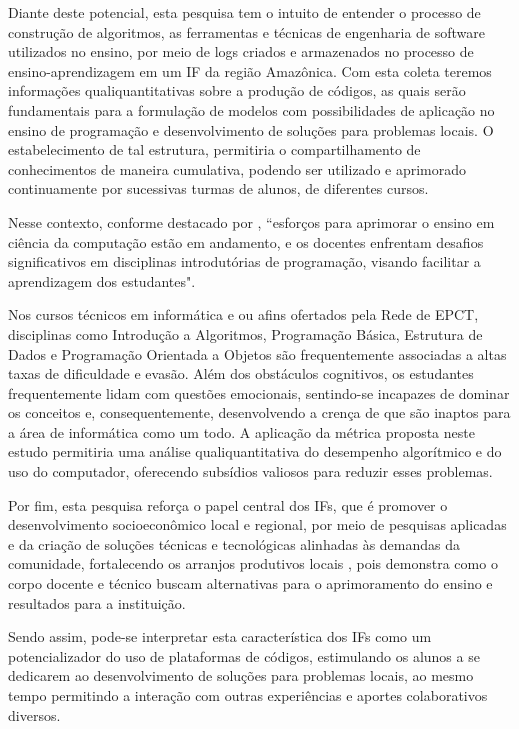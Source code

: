Diante deste potencial, esta pesquisa tem o intuito de entender o 
processo de construção de algoritmos, as ferramentas e técnicas de 
engenharia de software utilizados no ensino, por meio de logs criados e 
armazenados no processo de ensino-aprendizagem em um IF da região 
Amazônica. Com esta coleta  teremos informações qualiquantitativas 
sobre a produção de códigos, as quais serão fundamentais para a 
formulação de modelos com possibilidades de aplicação no ensino de 
programação e desenvolvimento de soluções para problemas locais. O 
estabelecimento de tal estrutura, permitiria o compartilhamento de 
conhecimentos de maneira cumulativa, podendo ser utilizado e aprimorado 
continuamente por  sucessivas turmas de alunos, de diferentes cursos.

Nesse contexto, conforme destacado por \cite{qian2017students}, 
``esforços para aprimorar o ensino em ciência da computação estão em 
andamento, e os docentes enfrentam desafios significativos em 
disciplinas introdutórias de programação, visando facilitar a 
aprendizagem dos estudantes". 

Nos cursos técnicos em informática e ou afins ofertados pela Rede de 
EPCT, disciplinas como Introdução a Algoritmos, Programação Básica, 
Estrutura de Dados e Programação Orientada a Objetos são frequentemente associadas a altas taxas de dificuldade e evasão. Além dos obstáculos 
cognitivos, os estudantes frequentemente lidam com questões emocionais, 
sentindo-se incapazes de dominar os conceitos e, consequentemente, 
desenvolvendo a crença de que são inaptos para a área de informática 
como um todo. A aplicação da métrica proposta neste estudo permitiria 
uma análise qualiquantitativa do desempenho algorítmico e do uso do 
computador, oferecendo subsídios valiosos para reduzir esses problemas.

Por fim, esta pesquisa reforça o papel central dos IFs, que é promover 
o desenvolvimento socioeconômico local e regional, por meio de 
pesquisas aplicadas e da criação de soluções técnicas e tecnológicas 
alinhadas às demandas da comunidade, fortalecendo os arranjos 
produtivos locais \cite{rodriguesuniversidades}, pois demonstra como o 
corpo docente e técnico buscam alternativas para o aprimoramento do 
ensino e resultados para a instituição. 

Sendo assim, pode-se interpretar esta característica dos IFs como um 
potencializador do uso de plataformas de códigos, estimulando os alunos 
a se dedicarem ao desenvolvimento de soluções para problemas locais, ao 
mesmo tempo permitindo a interação com outras experiências e aportes 
colaborativos diversos.

